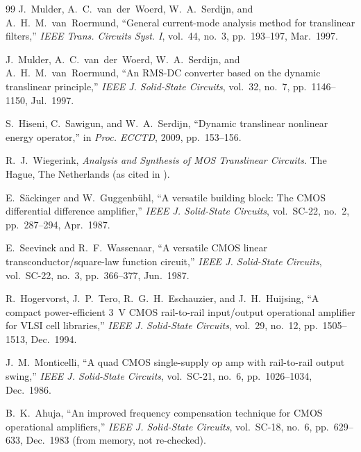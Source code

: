 \documentclass[journal]{IEEEtran}
\begin{document}
\begin{thebibliography}{99}
J.~Mulder, A.~C.~van~der~Woerd, W.~A.~Serdijn, and A.~H.~M.~van~Roermund, ``General
current-mode analysis method for translinear filters,'' \emph{IEEE Trans. Circuits Syst. I},
vol.~44, no.~3, pp.~193--197, Mar.~1997.

J.~Mulder, A.~C.~van~der~Woerd, W.~A.~Serdijn, and A.~H.~M.~van~Roermund, ``An RMS-DC
converter based on the dynamic translinear principle,'' \emph{IEEE J. Solid-State Circuits},
vol.~32, no.~7, pp.~1146--1150, Jul.~1997.

S.~Hiseni, C.~Sawigun, and W.~A.~Serdijn, ``Dynamic translinear nonlinear energy operator,''
in \emph{Proc. ECCTD}, 2009, pp.~153--156.

R.~J.~Wiegerink, \emph{Analysis and Synthesis of MOS Translinear Circuits}. The Hague, The
Netherlands (as cited in \cite{edwards_thesis}).

E.~S\"ackinger and W.~Guggenb\"uhl, ``A versatile building block: The CMOS differential
difference amplifier,'' \emph{IEEE J. Solid-State Circuits}, vol.~SC-22, no.~2,
pp.~287--294, Apr.~1987.

E.~Seevinck and R.~F.~Wassenaar, ``A versatile CMOS linear transconductor/square-law function
circuit,'' \emph{IEEE J. Solid-State Circuits}, vol.~SC-22, no.~3, pp.~366--377, Jun.~1987.

R.~Hogervorst, J.~P.~Tero, R.~G.~H.~Eschauzier, and J.~H.~Huijsing, ``A compact
power-efficient 3~V CMOS rail-to-rail input/output operational amplifier for VLSI cell
libraries,'' \emph{IEEE J. Solid-State Circuits}, vol.~29, no.~12, pp.~1505--1513,
Dec.~1994.

J.~M.~Monticelli, ``A quad CMOS single-supply op amp with rail-to-rail output swing,''
\emph{IEEE J. Solid-State Circuits}, vol.~SC-21, no.~6, pp.~1026--1034, Dec.~1986.

B.~K.~Ahuja, ``An improved frequency compensation technique for CMOS operational
amplifiers,'' \emph{IEEE J. Solid-State Circuits}, vol.~SC-18, no.~6, pp.~629--633,
Dec.~1983 (from memory, not re-checked).
\end{thebibliography}
\end{document}

